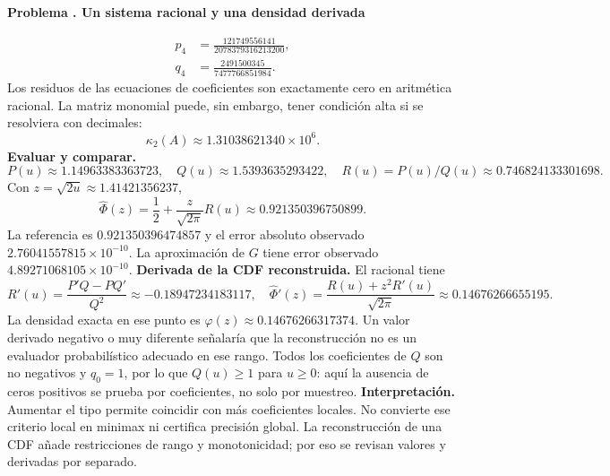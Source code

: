 \documentclass[11pt,a4paper]{article}
\theoremstyle{definition}
\newcounter{problema}
\newenvironment{resuelto}[1]{\refstepcounter{problema}\par\medskip\Needspace{6\baselineskip}\textbf{Problema \theproblema. #1}\par}{\par\medskip}
\begin{document}
\begin{resuelto}{Un sistema racional y una densidad derivada}
\[\]
\[
\begin{aligned}p_4&=\frac{121749556141}{2078379316213200},\\q_4&=\frac{2491500345}{7477766851984}.\end{aligned}
\]
Los residuos de las ecuaciones de coeficientes son exactamente cero en aritmética racional. La matriz monomial puede, sin embargo, tener condición alta si se resolviera con decimales:
\[
\kappa_2(A)\approx1.31038621340\times10^{6}.
\]
\textbf{Evaluar y comparar.}
\[
P(u)\approx1.14963383363723,\quad Q(u)\approx1.5393635293422,\quad R(u)=P(u)/Q(u)\approx0.746824133301698.
\]
Con $z=\sqrt{2u}\approx1.41421356237$,
\[
\widehat\Phi(z)=\frac12+\frac z{\sqrt{2\pi}}R(u)\approx0.921350396750899.
\]
La referencia es $0.921350396474857$ y el error absoluto observado $2.76041557815\times10^{-10}$. La aproximación de $G$ tiene error observado $4.89271068105\times10^{-10}$.
\textbf{Derivada de la CDF reconstruida.} El racional tiene
\[
R\prime(u)=\frac{P\prime Q-PQ\prime}{Q^2}\approx-0.18947234183117,\quad
\widehat\Phi\prime(z)=\frac{R(u)+z^2R\prime(u)}{\sqrt{2\pi}}\approx0.14676266655195.
\]
La densidad exacta en ese punto es $\varphi(z)\approx0.14676266317374$. Un valor derivado negativo o muy diferente señalaría que la reconstrucción no es un evaluador probabilístico adecuado en ese rango.
Todos los coeficientes de $Q$ son no negativos y $q_0=1$, por lo que $Q(u)\ge1$ para $u\ge0$: aquí la ausencia de ceros positivos se prueba por coeficientes, no solo por muestreo.
\textbf{Interpretación.} Aumentar el tipo permite coincidir con más coeficientes locales. No convierte ese criterio local en minimax ni certifica precisión global. La reconstrucción de una CDF añade restricciones de rango y monotonicidad; por eso se revisan valores y derivadas por separado.
\end{resuelto}
\end{document}

